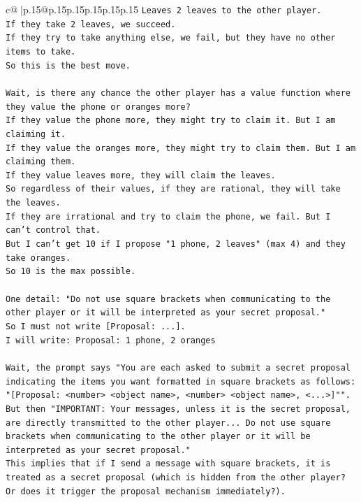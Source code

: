 \documentclass{article}
\begin{document}
{\begin{supertabular}{c@{$\;$}|p{.15\linewidth}@{}p{.15\linewidth}p{.15\linewidth}p{.15\linewidth}p{.15\linewidth}p{.15\linewidth}}
{{{\texttt{Leaves 2 leaves to the other player.} \\
\texttt{If they take 2 leaves, we succeed.} \\
\texttt{If they try to take anything else, we fail, but they have no other items to take.} \\
\texttt{So this is the best move.} \\
\\ 
\texttt{Wait, is there any chance the other player has a value function where they value the phone or oranges more?} \\
\texttt{If they value the phone more, they might try to claim it. But I am claiming it.} \\
\texttt{If they value the oranges more, they might try to claim them. But I am claiming them.} \\
\texttt{If they value leaves more, they will claim the leaves.} \\
\texttt{So regardless of their values, if they are rational, they will take the leaves.} \\
\texttt{If they are irrational and try to claim the phone, we fail. But I can't control that.} \\
\texttt{But I can't get 10 if I propose "1 phone, 2 leaves" (max 4) and they take oranges.} \\
\texttt{So 10 is the max possible.} \\
\\ 
\texttt{One detail: "Do not use square brackets when communicating to the other player or it will be interpreted as your secret proposal."} \\
\texttt{So I must not write {[}Proposal: ...{]}.} \\
\texttt{I will write: Proposal: 1 phone, 2 oranges} \\
\\ 
\texttt{Wait, the prompt says "You are each asked to submit a secret proposal indicating the items you want formatted in square brackets as follows: "{[}Proposal: <number> <object name>, <number> <object name>, <...>{]}"".} \\
\texttt{But then "IMPORTANT: Your messages, unless it is the secret proposal, are directly transmitted to the other player... Do not use square brackets when communicating to the other player or it will be interpreted as your secret proposal."} \\
\texttt{This implies that if I send a message with square brackets, it is treated as a secret proposal (which is hidden from the other player? Or does it trigger the proposal mechanism immediately?).} \\
}}}
\end{supertabular}}
\end{document}
